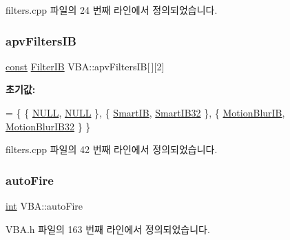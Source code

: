 filters.\+cpp 파일의 24 번째 라인에서 정의되었습니다.

\mbox{\label{class_v_b_a_a146f20875aaa489ae1b57d31918f25f8}} 
\subsubsection{\texorpdfstring{apv\+Filters\+IB}{apvFiltersIB}}
{\footnotesize\ttfamily \mbox{\hyperlink{getopt1_8c_a2c212835823e3c54a8ab6d95c652660e}{const}} \mbox{\hyperlink{class_v_b_a_a3269ee707f37ad255f2b7b0f20921158}{Filter\+IB}} V\+B\+A\+::apv\+Filters\+IB\mbox{[}$\,$\mbox{]}\mbox{[}2\mbox{]}\hspace{0.3cm}{\ttfamily [static]}}

{\bfseries 초기값\+:}
\begin{DoxyCode}
=
\{
  \{ \mbox{\hyperlink{getopt1_8c_a070d2ce7b6bb7e5c05602aa8c308d0c4}{NULL}},         \mbox{\hyperlink{getopt1_8c_a070d2ce7b6bb7e5c05602aa8c308d0c4}{NULL}}           \},
  \{ \mbox{\hyperlink{filters_8h_a9f004c820bb4707dd9a43c2c3e9c851d}{SmartIB}},      \mbox{\hyperlink{filters_8h_a408385952d763c13c6be333f2989f7fb}{SmartIB32}}      \},
  \{ \mbox{\hyperlink{filters_8h_a4b388a2f01620e0bf2e9a1c10c189866}{MotionBlurIB}}, \mbox{\hyperlink{filters_8h_afd60c9159e817571e02d1958b27b7f76}{MotionBlurIB32}} \}
\}
\end{DoxyCode}


filters.\+cpp 파일의 42 번째 라인에서 정의되었습니다.

\mbox{\label{class_v_b_a_a1a3c37d6609939c821133cf4a2cd9d0d}} 
\subsubsection{\texorpdfstring{auto\+Fire}{autoFire}}
{\footnotesize\ttfamily \mbox{\hyperlink{_util_8cpp_a0ef32aa8672df19503a49fab2d0c8071}{int}} V\+B\+A\+::auto\+Fire}



V\+B\+A.\+h 파일의 163 번째 라인에서 정의되었습니다.

\mbox{\label{class_v_b_a_a846626fa8ac7d18c7622e4ec49c526ff}} 
